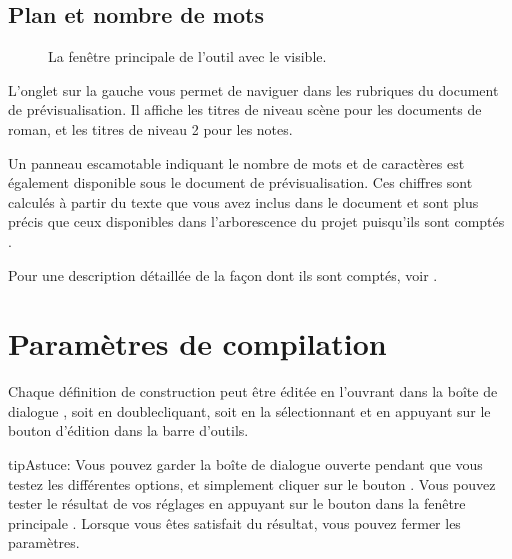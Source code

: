 \documentclass[a4paper,11pt,french]{sphinxmanual}
\begin{document}
\subsection{Plan et nombre de mots}
\label{\detokenize{project_manuscript:outline-and-word-counts}}
\begin{figure}[htbp]
\centering
\capstart

\noindent{}
\caption{La fenêtre principale de l’outil  avec le  visible.}\label{\detokenize{project_manuscript:id2}}\end{figure}

\sphinxAtStartPar
L’onglet  sur la gauche vous permet de naviguer dans les rubriques du document de prévisualisation. Il affiche les titres de niveau scène pour les documents de roman, et les titres de niveau 2 pour les notes.

\sphinxAtStartPar
Un panneau escamotable indiquant le nombre de mots et de caractères est également disponible sous le document de prévisualisation. Ces chiffres sont calculés à partir du texte que vous avez inclus dans le document et sont plus précis que ceux disponibles dans l’arborescence du projet puisqu’ils sont comptés .

\sphinxAtStartPar
Pour une description détaillée de la façon dont ils sont comptés, voir {\hyperref[\detokenize{more_counting:a-counting}]{}}.


\section{Paramètres de compilation}
\label{\detokenize{project_manuscript:build-settings}}\label{\detokenize{project_manuscript:a-manuscript-settings}}
\sphinxAtStartPar
Chaque définition de construction peut être éditée en l’ouvrant dans la boîte de dialogue , soit en double\sphinxhyphen{}cliquant, soit en la sélectionnant et en appuyant sur le bouton d’édition dans la barre d’outils.

\begin{sphinxadmonition}{tip}{Astuce:}
\sphinxAtStartPar
Vous pouvez garder la boîte de dialogue  ouverte pendant que vous testez les différentes options, et simplement cliquer sur le bouton . Vous pouvez tester le résultat de vos réglages en appuyant sur le bouton  dans la fenêtre principale . Lorsque vous êtes satisfait du résultat, vous pouvez fermer les paramètres.
\end{sphinxadmonition}
\end{document}
